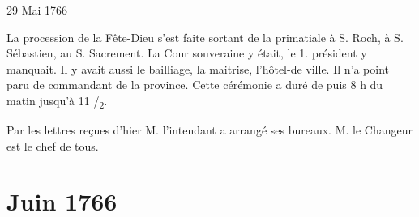                      \begin{diary}{29 Mai 1766}{}

                         La procession de la Fête-Dieu s'est
                           faite
                           sortant de la
                              primatiale à S.
                              Roch, à S.
                              Sébastien, au S. Sacrement. La Cour souveraine
                           y était, le 1. président y manquait. Il y
                           avait aussi le bailliage,
                              la maitrise,
                           l'hôtel-de ville. Il n'a point paru
                           de
                           commandant de la province. Cette cérémonie
                           a duré de puis 8 h du matin jusqu'à 11 /\textsubscript{2}. \bigskip


                         Par les lettres reçues d'hier M. l'intendant
                           a arrangé ses bureaux. M. le
                              Changeur est
                           le chef de tous. \bigskip


                     \end{diary}
                  \chapter*{Juin 1766}


